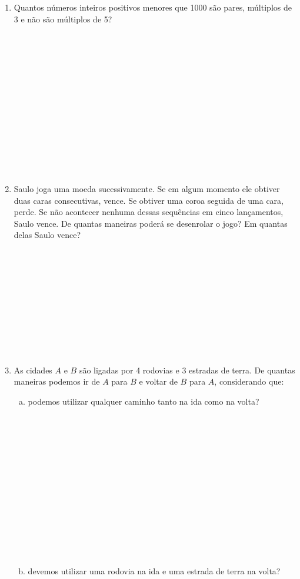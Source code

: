 \documentclass[a4paper,14pt]{article}
\begin{document}
\begin{multicols}{2}
\begin{enumerate}
	        \item Quantos números inteiros positivos menores que 1000 são pares, múltiplos de 3 e não são múltiplos de 5? \\\\\\\\\\\\\\\\\\\\\\\\\\\\
	        \item Saulo joga uma moeda sucessivamente. Se em algum momento ele obtiver duas caras consecutivas, vence. Se obtiver uma coroa seguida de uma cara, perde. Se não acontecer nenhuma dessas sequências em cinco lançamentos, Saulo vence. De quantas maneiras poderá se desenrolar o jogo? Em quantas delas Saulo vence? \\\\\\\\\\\\\\\\\\\\\\
	        \item As cidades $A$ e $B$ são ligadas por 4 rodovias e 3 estradas de terra. De quantas maneiras podemos ir de $A$ para $B$ e voltar de $B$ para $A$, considerando que:
	        \begin{enumerate}[a)]
	        	\item podemos utilizar qualquer caminho tanto na ida como na volta? \\\\\\\\\\\\\\\\\\\\\\\\\\\\
	        	\item devemos utilizar uma rodovia na ida e uma estrada de terra na volta? \\\\\\\\\\\\\\\\\\\\\\\\\\\\

\end{enumerate}
\end{enumerate}
\end{multicols}
\end{document}

